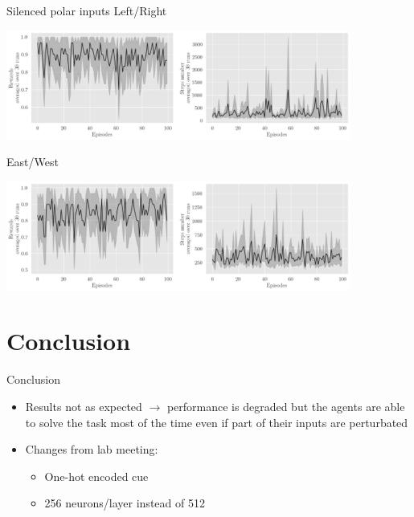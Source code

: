 \documentclass[bigger]{beamer}
\begin{document}
\begin{frame}[label={sec:org0903287}]{Silenced polar inputs}
\centering
Left/Right
\begin{center}
\includegraphics[width=0.85\textwidth]{medias/LeftRight/exp_keep-cartesian_silence-True.png}
\end{center}

East/West
\begin{center}
\includegraphics[width=0.85\textwidth]{medias/EastWest/exp_keep-cartesian_silence-True.png}
\end{center}
\end{frame}
\section{Conclusion}
\label{sec:org1cca607}
\begin{frame}[label={sec:org326229a}]{Conclusion}
\begin{itemize}
\item Results not as expected \(\to\) performance is degraded but the agents are able to solve the task most of the time even if part of their inputs are perturbated
\item Changes from lab meeting:
\begin{itemize}
\item One-hot encoded cue
\item 256 neurons/layer instead of 512
\end{itemize}
\end{itemize}
\end{frame}
\end{document}
